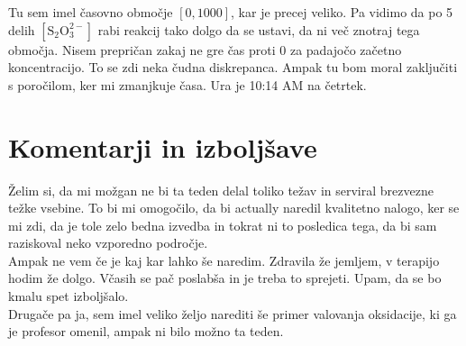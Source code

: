 \documentclass[a4paper]{article}
\begin{document}
Tu sem imel časovno območje $[0, 1000]$, kar je precej veliko. Pa vidimo da po 5 delih $[\mathrm{S}_2\mathrm{O}_3^{2-}]$
rabi reakcij tako dolgo da se ustavi, da ni več znotraj tega območja. Nisem prepričan zakaj ne gre čas proti $0$ za 
padajočo začetno koncentracijo. To se zdi neka čudna diskrepanca. Ampak tu bom moral zaključiti s poročilom,
ker mi zmanjkuje časa. Ura je 10:14 AM na četrtek.\\


\section{Komentarji in izboljšave}
Želim si, da mi možgan ne bi ta teden delal toliko težav in serviral brezvezne težke vsebine.
To bi mi omogočilo, da bi actually naredil kvalitetno nalogo, ker se mi zdi, da je tole zelo bedna izvedba
in tokrat ni to posledica tega, da bi sam raziskoval neko vzporedno področje. \\

Ampak ne vem če je kaj kar lahko še naredim. Zdravila že jemljem, v terapijo hodim že dolgo. Včasih 
se pač poslabša in je treba to sprejeti. Upam, da se bo kmalu spet izboljšalo. \\

Drugače pa ja, sem imel veliko željo narediti še primer valovanja oksidacije, ki ga je profesor omenil,
ampak ni bilo možno ta teden. 


%
%
\end{document}
